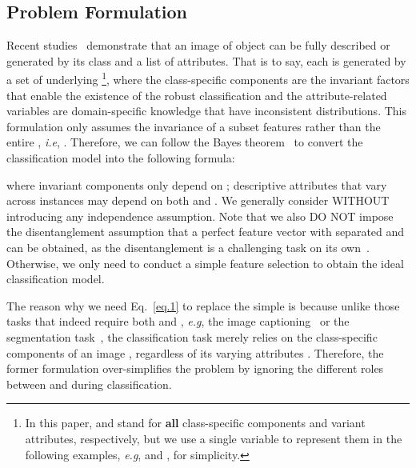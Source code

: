 \documentclass{article}
\def\eg{\emph{e.g}} \def\Eg{\emph{E.g}}
\def\ie{\emph{i.e}} \def\Ie{\emph{I.e}}
\begin{document}
\subsection{Problem Formulation} 



Recent studies~\cite{mirza2014conditional,besserve2018counterfactuals,wang2021self} demonstrate that an image of object  can be fully described or generated by its class and a list of attributes. That is to say, each  is generated by a set of underlying \footnote{In this paper,  and  stand for \textbf{all} class-specific components and variant attributes, respectively, but we use a single variable to represent them in the following examples, \eg,  and , for simplicity.}, where the class-specific components  are the invariant factors that enable the existence of the robust classification and the attribute-related variables  are domain-specific knowledge that have inconsistent distributions. This formulation only assumes the invariance of a subset features  rather than the entire , \ie, . Therefore, we can follow the Bayes theorem~\cite{stone2013bayes} to convert the classification model  into the following formula: 

where invariant components  only depend on ; descriptive attributes  that vary across instances may depend on both  and . We generally consider  WITHOUT introducing any independence assumption. Note that we also DO NOT impose the disentanglement assumption that a perfect feature vector  with separated  and  can be obtained, as the disentanglement is a challenging task on its own~\cite{locatello2019challenging}. Otherwise, we only need to conduct a simple feature selection to obtain the ideal classification model.

The reason why we need Eq.~\eqref{eq.1} to replace the simple  is because unlike those tasks that indeed require both  and , \eg, the image captioning~\cite{you2016image} or the segmentation task~\cite{he2017mask}, the classification task merely relies on the class-specific components  of an image , regardless of its varying attributes .  Therefore, the former formulation  over-simplifies the problem by ignoring the different roles between  and  during classification. 
\end{document}
